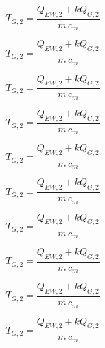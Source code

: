 \begin{equation*}
    T_{G,2} = \frac{Q_{EW,2} + k Q_{G,2}}{m \, c_m}
\end{equation*}

\begin{equation*}
    T_{G,2} = \frac{Q_{EW,2} + k Q_{G,2}}{m \, c_m}
\end{equation*}

\begin{equation*}
    T_{G,2} = \frac{Q_{EW,2} + k Q_{G,2}}{m \, c_m}
\end{equation*}

\begin{equation*}
    T_{G,2} = \frac{Q_{EW,2} + k Q_{G,2}}{m \, c_m}
\end{equation*}

\begin{equation*}
    T_{G,2} = \frac{Q_{EW,2} + k Q_{G,2}}{m \, c_m}
\end{equation*}

\begin{equation*}
    T_{G,2} = \frac{Q_{EW,2} + k Q_{G,2}}{m \, c_m}
\end{equation*}

\begin{equation*}
    T_{G,2} = \frac{Q_{EW,2} + k Q_{G,2}}{m \, c_m}
\end{equation*}

\begin{equation*}
    T_{G,2} = \frac{Q_{EW,2} + k Q_{G,2}}{m \, c_m}
\end{equation*}

\begin{equation*}
    T_{G,2} = \frac{Q_{EW,2} + k Q_{G,2}}{m \, c_m}
\end{equation*}

\begin{equation*}
    T_{G,2} = \frac{Q_{EW,2} + k Q_{G,2}}{m \, c_m}
\end{equation*}

